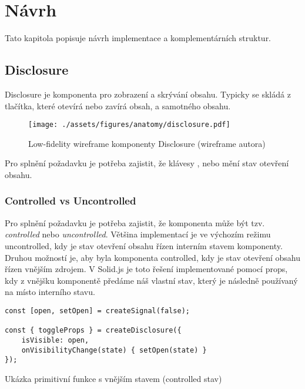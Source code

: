 \chapter{Návrh}

Tato kapitola popisuje návrh implementace a komplementárních struktur.

\section{Disclosure}

Disclosure je komponenta pro zobrazení a skrývání obsahu.
Typicky se skládá z tlačítka, které otevírá nebo zavírá obsah, a samotného obsahu.

\begin{figure}[htp]
    \centering
    \texttt{[image: ./assets/figures/anatomy/disclosure.pdf]}
    \captionsetup{justification=centering}
    \caption[Low-fidelity wireframe komponenty Disclosure]{Low-fidelity wireframe komponenty Disclosure (wireframe autora)}
\end{figure}

Pro splnění požadavku \hyperref[ofr11]{} je potřeba zajistit, že klávesy \keys{\SPACE}, nebo \keys{\enter} mění stav otevření obsahu.

\subsection{Controlled vs Uncontrolled}

Pro splnění požadavku \hyperref[dfr12]{} je potřeba zajistit, že komponenta může být tzv. \textit{controlled} nebo \textit{uncontrolled}.
Většina implementací je ve výchozím režimu uncontrolled, kdy je stav otevření obsahu řízen interním stavem komponenty.
Druhou možností je, aby byla komponenta controlled, kdy je stav otevření obsahu řízen vnějším zdrojem.
V Solid.js je toto řešení implementované pomocí props, kdy z vnějšku komponentě předáme náš vlastní stav, který je následně používaný na místo interního stavu.

\begin{listing}[!ht]
    \begin{verbatim}
const [open, setOpen] = createSignal(false);

const { toggleProps } = createDisclosure({
    isVisible: open,
    onVisibilityChange(state) { setOpen(state) }
});
\end{verbatim}
    \caption{Ukázka primitivní funkce s vnějším stavem (controlled stav)}
    \label{disclosure-controlled-vs-uncontrolled}
\end{listing}

